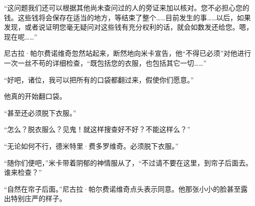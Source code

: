 \par “这问题我们还可以根据其他尚未查问过的人的旁证来加以核对。您不必担心您的钱。这些钱将会保存在适当的地方，等结束了整个……目前发生的事……以后，如果发现，或者说证明您毫无疑问对这些钱有充分权利的话，就会如数发还给您。嗯，现在呢……”
\par 尼古拉·帕尔费诺维奇忽然站起来，断然地向米卡宣告，他“不得已必须”对他进行一次一丝不苟的详细检查，“既包括您的衣服，也包括其它一切……”
\par “好吧，诸位，我可以把所有的口袋都翻过来，假使你们愿意。”
\par 他真的开始翻口袋。
\par “甚至还必须脱下衣服。”
\par “怎么？脱衣服么？见鬼！就这样搜查好不好？不能这样么？”
\par “无论如何不行，德米特里·费多罗维奇。必须脱下衣服。”
\par “随你们便吧，”米卡带着阴郁的神情服从了，“不过请不要在这里，到帘子后面去。谁来检查？”
\par “自然在帘子后面。”尼古拉·帕尔费诺维奇点头表示同意。他那张小小的脸甚至露出特别庄严的样子。
